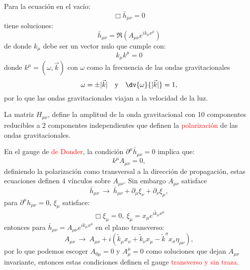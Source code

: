 \documentclass[../main]{subfiles}
\begin{document}
\begin{adjustwidth}{0pt}{-100pt}
Para la ecuación en el vacío:
\begin{equation}
    \Box \bar{h}_{\mu\nu}=0
\end{equation}
tiene soluciones:
\begin{equation}
    \bar{h}_{\mu\nu}=\Re(A_{\mu\nu}e^{ik_{\mu}x^{\mu}})
\end{equation}
de donde $k_{\mu}$ debe ser un vector nulo que cumple con:
\begin{equation}
    k_{\mu}k^{\mu}=0
\end{equation}
donde $k^{\mu}=(\omega, \vec{k})$ con $\omega$ como la frecuencia de las ondas gravitacionales 
\begin{equation}
    \omega=\pm |\vec{k}| \quad \text{y} \quad \dv{\omega}{|\vec{k}|}=1,
\end{equation}
por lo que las ondas gravitacionales viajan a la velocidad de la luz.

La matriz $H_{\mu\nu}$, define la amplitud de la onda gravitacional con 10 componentes reducibles a 2 componentes independientes que definen la \textcolor{red}{polarización} de las ondas gravitacionales.

En el gauge de \textcolor{red}{de Donder}, la condición $\partial^{\mu}\bar{h}_{\mu\nu}=0$ implica que:
\begin{equation}
    k^{\mu}A_{\mu\nu}=0,
\end{equation}
definiendo la polarización como transversal a la dirección de propagación, estas ecuaciones definen 4 vínculos sobre $A_{\mu\nu}$. Sin embargo $A_{\mu\nu}$ satisface 
\begin{equation}
    \bar{h}_{\mu\nu} \ \rightarrow \ \bar{h}_{\mu\nu}+\partial_{\mu}\xi_{\nu}+\partial_{\nu}\xi_{\mu},
\end{equation}
para $\partial^{\mu}h_{\mu\nu}=0$, $\xi_{\mu}$ satisface:
\begin{equation}
    \Box \xi_{\mu}=0, \ \xi_{\mu}=x_{\mu}e^{i\tilde{k}_{\mu} x^{\mu}}
\end{equation}
entonces para $\bar{h}_{\mu\nu}=A_{\mu\nu}e^{ik_{\mu}x^{\mu}}$ en el plano transverso:
\begin{equation}
    A_{\mu\nu} \ \rightarrow \ A_{\mu\nu}+i(\tilde{k}_{\mu}x_{\nu}+\tilde{k}_{\nu}x_{\mu}-\tilde{k}^{\sigma}x_{\sigma}\eta_{\mu\nu}),
\end{equation}
por lo que podemos escoger $A_{0\mu}=0$ y $A^{\mu}_{\mu}=0$ como soluciones que dejan $A_{\mu\nu}$ invariante, entonces estas condiciones definen el gauge \textcolor{red}{transverso y sin traza}.


\end{adjustwidth}
\end{document}

